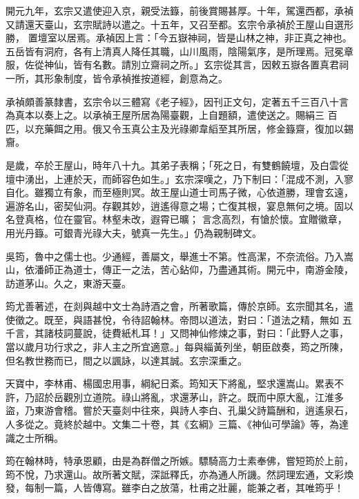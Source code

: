 \begin{pinyinscope}
 開元九年，玄宗又遣使迎入京，親受法籙，前後賞賜甚厚。十年，駕還西都，承禎又請還天臺山，玄宗賦詩以遣之。十五年，又召至都。玄宗令承禎於王屋山自選形勝，
 置壇室以居焉。承禎因上言：「今五嶽神祠，皆是山林之神，非正真之神也。五岳皆有洞府，各有上清真人降任其職，山川風雨，陰陽氣序，是所理焉。冠冕章服，佐從神仙，皆有名數。請別立齋祠之所。」玄宗從其言，因敕五嶽各置真君祠一所，其形象制度，皆令承禎推按道經，創意為之。



 承禎頗善篆隸書，玄宗令以三體寫《老子經》，因刊正文句，定著五千三百八十言為真本以奏上之。以承禎王屋所居為陽臺觀，上自題額，遣使送之。賜絹三
 百匹，以充藥餌之用。俄又令玉真公主及光祿卿韋縚至其所居，修金籙齋，復加以錫齎。



 是歲，卒於王屋山，時年八十九。其弟子表稱；「死之日，有雙鶴饒壇，及白雲從壇中湧出，上連於天，而師容色如生。」玄宗深嘆之，乃下制曰：「混成不測，入寥自化。雖獨立有象，而至極則冥。故王屋山道士司馬子微，心依道勝，理會玄遠，遍游名山，密契仙洞。存觀其妙，逍遙得意之場；亡復其根，宴息無何之境。固以名登真格，位在靈官。林壑未改，遐霄已曠；
 言念高烈，有愴於懷。宜贈徽章，用光丹籙。可銀青光祿大夫，號真一先生。」仍為親制碑文。



 吳筠，魯中之儒士也。少通經，善屬文，舉進士不第。性高潔，不奈流俗。乃入嵩山，依潘師正為道士，傳正一之法，苦心鉆仰，乃盡通其術。開元中，南游金陵，訪道茅山。久之，東游天臺。



 筠尤善著述，在剡與越中文士為詩酒之會，所著歌篇，傳於京師。玄宗聞其名，遣使徵之。既至，與語甚悅，令待詔翰林。帝問以道法，對曰：「道法之精，無如
 五千言，其諸枝詞蔓說，徒費紙札耳！」又問神仙修煉之事，對曰：「此野人之事，當以歲月功行求之，非人主之所宜適意。」每與緇黃列坐，朝臣啟奏，筠之所陳，但名教世務而已，間之以諷詠，以達其誠。玄宗深重之。



 天寶中，李林甫、楊國忠用事，綱紀日紊。筠知天下將亂，堅求還嵩山。累表不許，乃詔於岳觀別立道院。祿山將亂，求還茅山，許之。既而中原大亂，江淮多盜，乃東游會稽。嘗於天臺剡中往來，與詩人李白、孔巢父詩篇酬和，逍遙泉石，
 人多從之。竟終於越中。文集二十卷，其《玄綱》三篇、《神仙可學論》等，為達識之士所稱。



 筠在翰林時，特承恩顧，由是為群僧之所嫉。驃騎高力士素奉佛，嘗短筠於上前，筠不悅，乃求還山。故所著文賦，深詆釋氏，亦為通人所譏。然詞理宏通，文彩煥發，每制一篇，人皆傳寫。雖李白之放蕩，杜甫之壯麗，能兼之者，其唯筠乎！




\end{pinyinscope}
